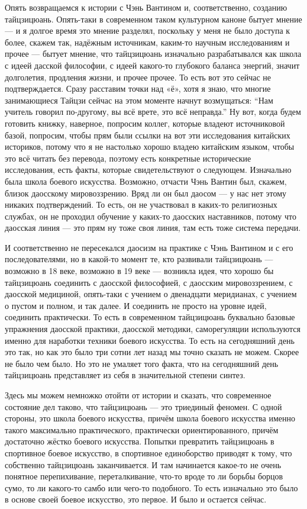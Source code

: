 Опять 
возвращаемся к истории с Чэнь Вантином и, соответственно, созданию тайцзицюань. Опять-таки в 
современном таком культурном каноне бытует мнение --- и я долгое время это мнение разделял, 
поскольку у меня не было доступа к более, скажем так, надёжным источникам, каким-то научным 
исследованиям и прочее --- бытует мнение, что тайцзицюань изначально разрабатывался как школа 
с идеей дасской философии, с идеей какого-то глубокого баланса энергий, значит долголетия, 
продления жизни, и прочее прочее. То есть вот это сейчас не подтверждается. Сразу 
расставим точки над «ё», хотя я знаю, что многие занимающиеся Тайцзи сейчас на этом моменте 
начнут возмущаться: ``Нам учитель говорил по-другому, вы всё врете, это всё неправда.'' Ну вот, 
когда будем готовить книжку, наверное, попросим коллег, которые владеют источниковой базой, 
попросим, чтобы прям были ссылки на вот эти исследования китайских историков, потому что я 
не настолько хорошо владею китайским языком, чтобы это всё читать без перевода, поэтому есть 
конкретные исторические исследования, есть факты, которые свидетельствуют о следующем. 
Изначально была школа боевого искусства. Возможно, отчасти Чэнь Вантин был, скажем, близок 
даосскому мировоззрению. Вряд ли он был даосом --- у нас нет этому никаких подтверждений. То есть,
он не участвовал в каких-то религиозных службах, он не проходил обучение у каких-то даосских 
наставников, потому что даосская линия --- это прям ну тоже своя линия, там есть тоже система 
передачи.

И соответственно не пересекался даосизм на практике с Чэнь Вантином и с его 
последователями, но в какой-то момент те, кто развивали тайцзицюань --- возможно в 18 веке,
возможно в 19 веке --- возникла идея, что хорошо бы тайцзицюань соединить с даосской философией,
с даосским мировоззрением, с даосской медициной, опять-таки с учением о двенадцати меридианах, с 
учением о пустом и полном, и так далее. И соединить не просто на уровне идей, соединить 
практически. То есть в современном тайцзицюань буквально базовые упражнения даосской 
практики, даосской методики, саморегуляции используются именно для наработки техники 
боевого искусства. То есть на сегодняшний день это так, но как это было три сотни лет назад мы 
точно сказать не можем. Скорее не было чем было. Но это не умаляет того факта, что на 
сегодняшний день тайцзицюань представляет из себя в значительной степени синтез.

Здесь мы 
можем немножко отойти от истории и сказать, что современное состояние дел таково, что
тайцзицюань --- это триединый феномен. С одной стороны, это школа боевого искусства, причём
школа боевого искусства именно такого максимально практического, практически ориентированного, 
причём достаточно жёстко боевого искусства. Попытки превратить тайцзицюань в спортивное 
боевое искусство, в спортивное единоборство приводят к тому, что собственно тайцзицюань 
заканчивается. И там начинается какое-то не очень понятное перепихивание, переталкивание, 
что-то вроде то ли борьбы борцов сумо, то ли какого-то самбо или чего-то подобного. То есть 
изначально это было в основе своей боевое искусство, это первое. И было и остается сейчас. 


